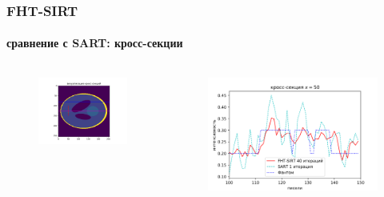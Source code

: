 \documentclass[12pt]{beamer}
\begin{document}
\begin{frame}
\frametitle{FHT-SIRT}
\framesubtitle{сравнение с SART: кросс-секции}
\begin{columns}[T,onlytextwidth]
  \hspace*{-1cm}
  \begin{column}{0.2\textwidth}
    \begin{figure}
      \centering
      \vspace{1.5cm}
      \includegraphics[width=1.5\textwidth]{cs_viz}
    \end{figure}
  \end{column}
  \begin{column}{0.8\textwidth}
    \begin{figure}
      \centering
      \vspace{-1cm}
      \includegraphics[width=1.2\textwidth]{cs_v_50}
    \end{figure}
  \end{column}
\end{columns}
\end{frame}
\end{document}
